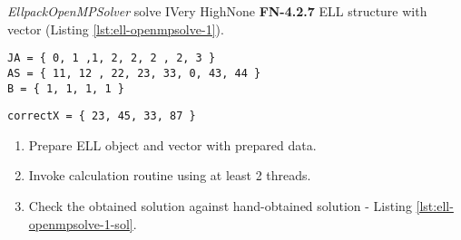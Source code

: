 \begin{testcase}{\emph{EllpackOpenMPSolver} solve I}{Very High}{None}
		{
			\textbf{FN-4.2.7}
		}
		{
			\gls{ELL} structure with vector (Listing \ref{lst:ell-openmpsolve-1}).	
		}
		\begin{lstlisting}[label={lst:ell-openmpsolve-1},caption={\gls{ELL} format and vector data example}, frame=single]
JA = { 0, 1 ,1, 2, 2, 2 , 2, 3 }
AS = { 11, 12 , 22, 23, 33, 0, 43, 44 }
B = { 1, 1, 1, 1 }
		\end{lstlisting}
		\begin{lstlisting}[label={lst:ell-openmpsolve-1-sol},caption={\gls{ELL} format and vector data example}, frame=single]
correctX = { 23, 45, 33, 87 }
		\end{lstlisting}
		
		{	
			\begin{enumerate}
				\item Prepare \gls{ELL} object and vector with prepared data.
				\item Invoke calculation routine using at least 2 threads.
				\item
				{
					Check the obtained solution against hand-obtained solution - Listing \ref{lst:ell-openmpsolve-1-sol}.
				}
			\end{enumerate}
		}
	\end{testcase}